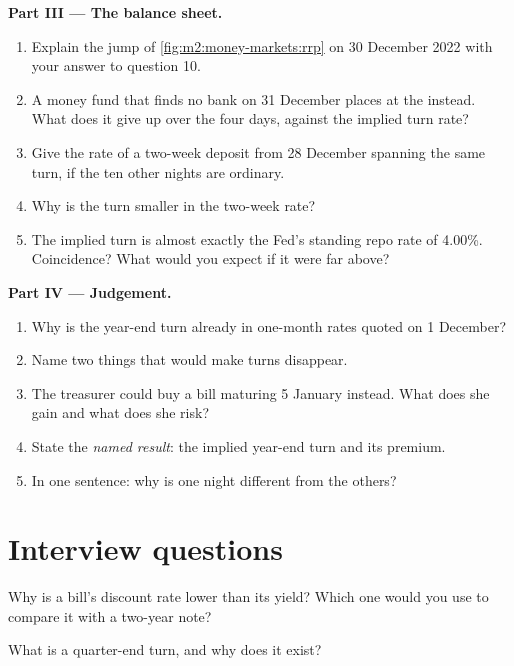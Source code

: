 \begin{problem}
\medskip\noindent\textbf{Part III --- The balance sheet.}
\begin{enumerate}[resume]
\item Explain the jump of \cref{fig:m2:money-markets:rrp} on 30 December 2022
with your answer to question 10.
\item A money fund that finds no bank on 31 December places at the  instead. What does it give up over the four days, against the
implied turn rate?
\item Give the rate of a two-week deposit from 28 December spanning the same
turn, if the ten other nights are ordinary.
\item Why is the turn smaller in the two-week rate?
\item The implied turn is almost exactly the Fed's standing repo rate of
4.00\%. Coincidence? What would you expect if it were far above?
\end{enumerate}

\medskip\noindent\textbf{Part IV --- Judgement.}
\begin{enumerate}[resume]
\item Why is the year-end turn already in one-month rates quoted on 1
December?
\item Name two things that would make turns disappear.
\item The treasurer could buy a bill maturing 5 January instead. What does she
gain and what does she risk?
\item State the \emph{named result}: the implied year-end turn and its premium.
\item In one sentence: why is one night different from the others?
\end{enumerate}
\end{problem}

\section{Interview questions}

\begin{interviewq}\label{iq:m2:money-markets:1}
Why is a bill's discount rate lower than its yield? Which one would you use to
compare it with a two-year note?
\end{interviewq}

\begin{interviewq}\label{iq:m2:money-markets:2}
What is a quarter-end turn, and why does it exist?
\end{interviewq}

